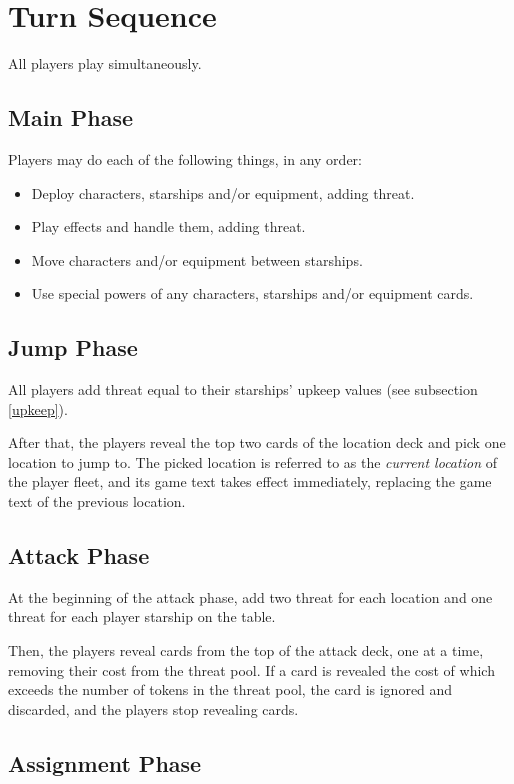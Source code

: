 \documentclass[11pt, a4paper]{article}
\begin{document}
\section{Turn Sequence}

All players play simultaneously.

\subsection{Main Phase}

Players may do each of the following things, in any order:

\begin{itemize}
 \item Deploy characters, starships and/or equipment, adding threat.
 \item Play effects and handle them, adding threat.
 \item Move characters and/or equipment between starships.
 \item Use special powers of any characters, starships and/or equipment cards.
\end{itemize}

\subsection{Jump Phase}

All players add threat equal to their starships' upkeep values (see subsection
\ref{upkeep}).

After that, the players reveal the top two cards of the location deck and pick
one location to jump to. The picked location is referred to as the
\emph{current location} of the player fleet, and its game text takes effect
immediately, replacing the game text of the previous location.

\subsection{Attack Phase}

At the beginning of the attack phase, add two threat for each location and one
threat for each player starship on the table.

Then, the players reveal cards from the top of the attack deck, one at a time,
removing their cost from the threat pool. If a card is revealed the cost of
which exceeds the number of tokens in the threat pool, the card is ignored and
discarded, and the players stop revealing cards.

\subsection{Assignment Phase}
\end{document}
